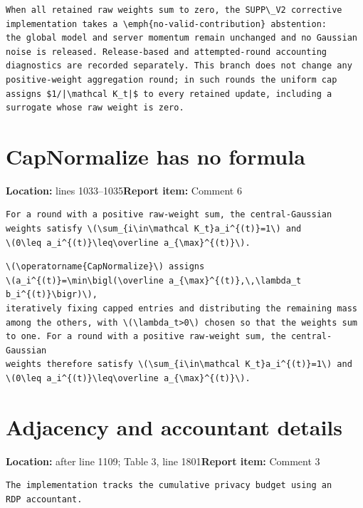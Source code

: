 \documentclass[10pt,a4paper]{article}
\newcommand{\issue}[3]{\section{#1}{\raggedright\noindent\textcolor{note}{\small\textbf{Location:} #2\quad\textbf{Report item:} #3}\par}\smallskip}
\begin{document}
\begin{after}
\begin{Verbatim}
When all retained raw weights sum to zero, the SUPP\_V2 corrective
implementation takes a \emph{no-valid-contribution} abstention:
the global model and server momentum remain unchanged and no Gaussian
noise is released. Release-based and attempted-round accounting
diagnostics are recorded separately. This branch does not change any
positive-weight aggregation round; in such rounds the uniform cap
assigns $1/|\mathcal K_t|$ to every retained update, including a
surrogate whose raw weight is zero.
\end{Verbatim}
\end{after}

\issue{CapNormalize has no formula}{lines 1033--1035}{Comment 6}

\begin{before}[lines 1033--1035]
\begin{Verbatim}
For a round with a positive raw-weight sum, the central-Gaussian
weights satisfy \(\sum_{i\in\mathcal K_t}a_i^{(t)}=1\) and
\(0\leq a_i^{(t)}\leq\overline a_{\max}^{(t)}\).
\end{Verbatim}
\end{before}

\begin{after}
\begin{Verbatim}
\(\operatorname{CapNormalize}\) assigns
\(a_i^{(t)}=\min\bigl(\overline a_{\max}^{(t)},\,\lambda_t b_i^{(t)}\bigr)\),
iteratively fixing capped entries and distributing the remaining mass
among the others, with \(\lambda_t>0\) chosen so that the weights sum
to one. For a round with a positive raw-weight sum, the central-Gaussian
weights therefore satisfy \(\sum_{i\in\mathcal K_t}a_i^{(t)}=1\) and
\(0\leq a_i^{(t)}\leq\overline a_{\max}^{(t)}\).
\end{Verbatim}
\end{after}

\issue{Adjacency and accountant details}{after line 1109; Table 3, line 1801}{Comment 3}

\begin{before}[line 1108]
\begin{Verbatim}
The implementation tracks the cumulative privacy budget using an
RDP accountant.
\end{Verbatim}
\end{before}
\end{document}
